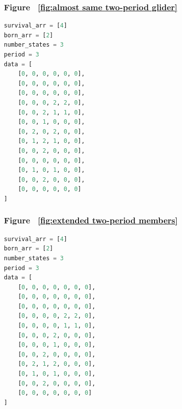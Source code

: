 \documentclass[12pt]{article}
\numberwithin{figure}{section} %
\begin{document}
\noindent\begin{minipage}{.45\textwidth}
\subsubsection{Figure ~\ref{fig:almost same two-period glider}}
\label{subsubsection:almost same two-period glider}
\begin{lstlisting}[language = Python]
survival_arr = [4]
born_arr = [2]
number_states = 3
period = 3
data = [
    [0, 0, 0, 0, 0, 0],
    [0, 0, 0, 0, 0, 0],
    [0, 0, 0, 0, 0, 0],
    [0, 0, 0, 2, 2, 0],
    [0, 0, 2, 1, 1, 0],
    [0, 0, 1, 0, 0, 0],
    [0, 2, 0, 2, 0, 0],
    [0, 1, 2, 1, 0, 0],
    [0, 0, 2, 0, 0, 0],
    [0, 0, 0, 0, 0, 0],
    [0, 1, 0, 1, 0, 0],
    [0, 0, 2, 0, 0, 0],
    [0, 0, 0, 0, 0, 0]
]
\end{lstlisting}
\end{minipage}\hfill
\begin{minipage}{.45\textwidth}
\subsubsection{Figure ~\ref{fig:extended two-period members}}
\label{subsubsection:extended two-period members(1/5)}
\begin{lstlisting}[language = Python]
survival_arr = [4]
born_arr = [2]
number_states = 3
period = 3
data = [
    [0, 0, 0, 0, 0, 0, 0],
    [0, 0, 0, 0, 0, 0, 0],
    [0, 0, 0, 0, 0, 0, 0],
    [0, 0, 0, 0, 2, 2, 0],
    [0, 0, 0, 0, 1, 1, 0],
    [0, 0, 0, 2, 0, 0, 0],
    [0, 0, 0, 1, 0, 0, 0],
    [0, 0, 2, 0, 0, 0, 0],
    [0, 2, 1, 2, 0, 0, 0],
    [0, 1, 0, 1, 0, 0, 0],
    [0, 0, 2, 0, 0, 0, 0],
    [0, 0, 0, 0, 0, 0, 0]
]

\end{lstlisting}
\end{minipage}
\end{document}

